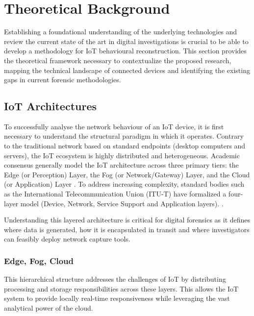 \section{Theoretical Background}
Establishing a foundational understanding of the underlying technologies and review the current state of the art in digital investigations is crucial to be able to develop a methodology for IoT behavioural reconstruction. This section provides the theoretical framework necessary to contextualize the proposed research, mapping the technical landscape of connected devices and identifying the existing gaps in current forensic methodologies.

\subsection{IoT Architectures}
To successfully analyse the network behaviour of an IoT device, it is first necessary to understand the structural paradigm in which it operates. Contrary to the traditional network based on standard endpoints (desktop computers and servers), the IoT ecosystem is highly distributed and heterogeneous. Academic consensus generally model the IoT architecture across three primary tiers: the Edge (or Perception) Layer, the Fog (or Network/Gateway) Layer, and the Cloud (or Application) Layer \cite{WinSystems2020}. To address increasing complexity, standard bodies such as the International Telecommunication Union (ITU-T) have formalized a four-layer model (Device, Network, Service Support and Application layers). \cite{ITUTY2060}.

Understanding this layered architecture is critical for digital forensics as it defines where data is generated, how it is encapsulated in transit and where investigators can feasibly deploy network capture tools.

\subsubsection{Edge, Fog, Cloud}

This hierarchical structure addresses the challenges of IoT by distributing processing and storage responsibilities across these layers. This allows the IoT system to provide locally real-time responsiveness while leveraging the vast analytical power of the cloud. 

